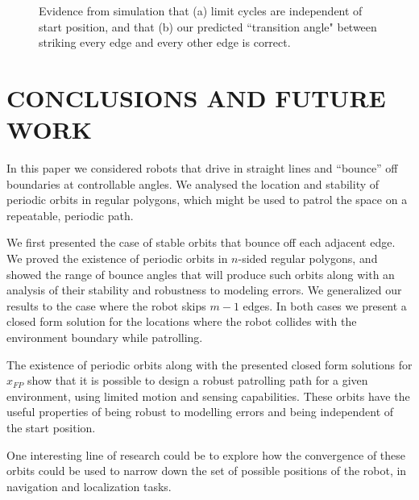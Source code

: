\documentclass[letterpaper, 10 pt, conference]{ieeeconf}  %
\begin{document}
\begin{figure}[bh]
\begin{subfigure}{0.23\textwidth}
\end{subfigure}
\caption{Evidence from simulation that (a) limit cycles are independent of start
position, and that (b) our predicted ``transition angle" between
striking every edge and every other edge is correct.}
\end{figure}



\section{CONCLUSIONS AND FUTURE WORK} \label{conclusion}

In this paper we considered robots that drive in straight 
lines and “bounce” off boundaries at controllable angles. 
We analysed the location and stability of periodic orbits in 
regular polygons, which might be used to patrol the space 
on a repeatable, periodic path.

We first presented the case of stable orbits that bounce 
off each adjacent edge. We proved the existence of periodic
orbits in $n$-sided regular polygons, and showed the range of
bounce angles that will produce such orbits along with an analysis 
of their stability and robustness to modeling errors.
We generalized our results to the case
where the robot skips $m-1$ edges. 
In both cases we present a closed form solution for the locations
where the robot collides with the environment boundary while 
patrolling. 

The existence of periodic orbits along with the presented 
closed form solutions for $x_{FP}$ show that it is possible to 
design a robust patrolling path for a given environment, using limited motion
and sensing capabilities. These orbits
have the useful properties of being robust to modelling errors and being
independent of the start position.

One interesting line of research could be to explore how the convergence of
these orbits could be used to narrow down the set of possible positions of the
robot, in navigation and localization tasks.
\end{document}
